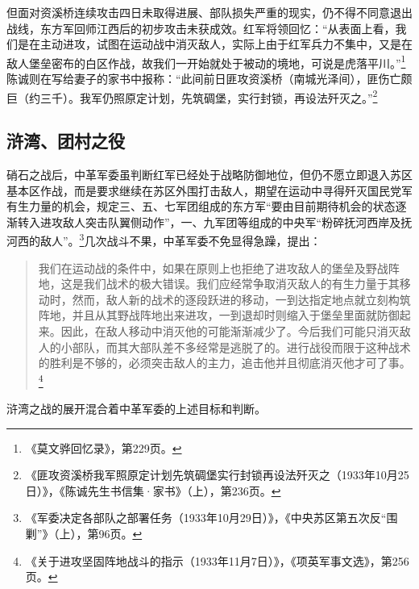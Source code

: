 但面对资溪桥连续攻击四日未取得进展、部队损失严重的现实，仍不得不同意退出战线，东方军回师江西后的初步攻击未获成效。红军将领回忆：“从表面上看，我们是在主动进攻，试图在运动战中消灭敌人，实际上由于红军兵力不集中，又是在敌人堡垒密布的白区作战，故我们一开始就处于被动的境地，可说是虎落平川。”\footnote{《莫文骅回忆录》，第229页。}陈诚则在写给妻子的家书中报称：“此间前日匪攻资溪桥（南城光泽间），匪伤亡颇巨（约三千）。我军仍照原定计划，先筑碉堡，实行封锁，再设法歼灭之。”\footnote{《匪攻资溪桥我军照原定计划先筑碉堡实行封锁再设法歼灭之（1933年10月25日）》，《陈诚先生书信集·家书》（上），第236页。}

\subsection{浒湾、团村之役}


硝石之战后，中革军委虽判断红军已经处于战略防御地位，但仍不愿立即退入苏区基本区作战，而是要求继续在苏区外围打击敌人，期望在运动中寻得歼灭国民党军有生力量的机会，规定三、五、七军团组成的东方军“要由目前期待机会的状态逐渐转入进攻敌人突击队翼侧动作”，一、九军团等组成的中央军“粉碎抚河西岸及抚河西的敌人”。\footnote{《军委决定各部队之部署任务（1933年10月29日）》，《中央苏区第五次反“围剿”》（上），第96页。}几次战斗不果，中革军委不免显得急躁，提出：

\begin{quote}

我们在运动战的条件中，如果在原则上也拒绝了进攻敌人的堡垒及野战阵地，这是我们战术的极大错误。我们应经常争取消灭敌人的有生力量于其移动时，然而，敌人新的战术的逐段跃进的移动，一到达指定地点就立刻构筑阵地，并且从其野战阵地出来进攻，一到退却时则缩入于堡垒里面就防御起来。因此，在敌人移动中消灭他的可能渐渐减少了。今后我们可能只消灭敌人的小部队，而其大部队差不多经常是逃脱了的。进行战役而限于这种战术的胜利是不够的，必须突击敌人的主力，追击他并且彻底消灭他才可了事。\footnote{《关于进攻坚固阵地战斗的指示（1933年11月7日）》，《项英军事文选》，第256页。}
\end{quote}


浒湾之战的展开混合着中革军委的上述目标和判断。


